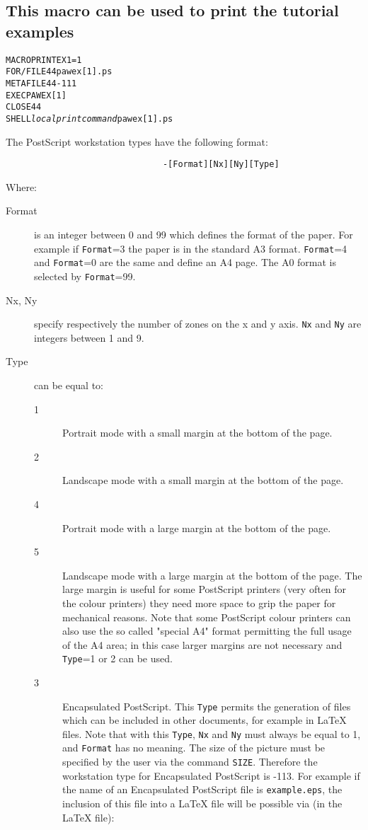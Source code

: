 \subsection*{This macro can be used to print the tutorial examples}
\begin{alltt}
      MACRO PRINTEX 1=1
      FOR/FILE 44 pawex[1].ps
      METAFILE 44 -111
      EXEC PAWEX[1]
      CLOSE 44
      SHELL {\it local print command} pawex[1].ps
\end{alltt} 
The PostScript workstation types have the following format:
\begin{verbatim}
                               -[Format][Nx][Ny][Type]
\end{verbatim}
    Where:
\begin{description}
\item[Format] is an integer between 0 and 99 which defines the format of the
              paper. For example if {\tt Format}=3 the paper is in the standard
              A3 format. {\tt Format}=4 and {\tt Format}=0 are the same and
              define an A4 page. The A0 format is selected by {\tt Format}=99.
\item[Nx, Ny] specify respectively the number of zones on the x and y axis.
              {\tt Nx} and {\tt Ny} are integers between 1 and 9.
\item[Type] can be equal to:
\begin{description}
\item[1] Portrait mode with a small margin at the bottom of the page.
\item[2] Landscape mode with a small margin at the bottom of the page.
\item[4] Portrait mode with a large margin at the bottom of the page.
\item[5] Landscape mode with a large margin at the bottom of the page. The
         large margin is useful for some PostScript printers (very often for
         the colour printers) they need more space to
         grip the paper for mechanical reasons. Note that some PostScript colour
         printers can also use the so called "special A4" format permitting
         the full usage of the A4 area; in this
         case larger margins are not necessary and {\tt Type}=1 or 2
         can be used.
\item[3] Encapsulated PostScript. This {\tt Type} permits the generation of
         files which can be
         included in other documents, for example
         in \LaTeX{} files. Note that with this {\tt Type}, {\tt Nx} and
         {\tt Ny} must always be equal to 1, and {\tt Format} has no meaning.
         The size of the picture must be specified by the user via the
         command {\tt SIZE}. Therefore the workstation type for
         Encapsulated PostScript is -113.
         For example if the name of an Encapsulated PostScript file is
         {\tt example.eps}, the
         inclusion of this file into a \LaTeX{} file will be possible via
         (in the \LaTeX{} file):
\end{description}
\end{description}
